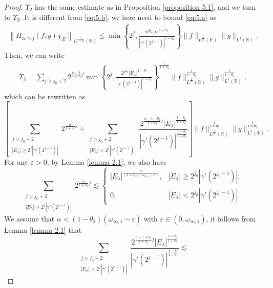 \documentclass[11pt, twoside, leqno]{article}
\theoremstyle{definition}
\numberwithin{equation}{section}
\begin{document}
\begin{proof}
$\Upsilon_2$ has the same estimate as in Proposition \ref{proposition 5.1}, and we turn to $\Upsilon_3$. It is different from \eqref{eq:5.b}, we here need to bound \eqref{eq:5.a} as
\begin{align}\label{eq:5.000}
  \left\|H_{\alpha,\gamma,j}(f,g)\chi_{E}\right\|_{L^{\frac{1}{1+\theta_2}}(\mathbb{R})}
\leq \min\left\{2^j,  \frac{2^{j\theta_2}|E|^{1-\theta_2}}{|\gamma'(2^{j-1})|^{1-\theta_2}} \right\} \|f\|_{L^{\frac{1}{\theta_2}}(\mathbb{R})}\|g\|_{L^{1}(\mathbb{R})}.
 \end{align}
Then, we can write
\begin{align*}
\Upsilon_{3}=\sum\limits_{j>j_{0}+2}2^{{\frac{\alpha-1}{1+\theta_{2}}}j}\min\left\{2^j,  \frac{2^{j\theta_2}|E_{\lambda}|^{1-\theta_2}}{|\gamma'(2^{j-1})|^{1-\theta_2}} \right\}^{\frac{1}{1+\theta_2}} \|f\|^{\frac{1}{1+\theta_2}}_{L^{\frac{1}{\theta_2}}(\mathbb{R})}\|g\|^{\frac{1}{1+\theta_2}}_{L^{1}(\mathbb{R})},
 \end{align*}
which can be rewritten as
$$\left[\sum\limits_{  \substack{j>j_{0}+2   \\ |E_{\lambda}|\geq2^j{|\gamma'(2^{j-1})|} }} 2^{{\frac{\alpha}{1+\theta_{2}}}j}+
\sum\limits_{  \substack{j>j_{0}+2   \\ |E_{\lambda}|<2^j{|\gamma'(2^{j-1})|} }} \frac{2^{{\frac{\alpha-1+\theta_{2}}{1+\theta_{2}}}j}
|E_\lambda|^{\frac{1-\theta_{2}}{1+\theta_{2}}}}{|\gamma'(2^{j-1})|^{\frac{1-\theta_{2}}{1+\theta_{2}}}}\right]
\|f\|^{\frac{1}{1+\theta_2}}_{L^{\frac{1}{\theta_2}}(\mathbb{R})}\|g\|^{\frac{1}{1+\theta_2}}_{L^{1}(\mathbb{R})}.$$
For any $\varepsilon>0$, by Lemma \ref{lemma 2.1}, we also have
$$\sum\limits_{  \substack{j>j_{0}+2   \\ |E_{\lambda}|\geq2^j{|\gamma'(2^{j-1})|} }} 2^{{\frac{\alpha}{1+\theta_{2}}}j}\lesssim
\begin{cases}
  |E_\lambda|^{\frac{\alpha}{(1+\theta_{2})(\omega_{\infty,1}-\varepsilon)}}, & |E_\lambda|\geq2^{j_0}|\gamma'(2^{j_{0}-1})|;\\
  0, & |E_\lambda|<2^{j_0}|\gamma'(2^{j_{0}-1})|.
\end{cases}$$
We assume that $\alpha<(1-\theta_2)(\omega_{\infty,1}-\varepsilon)$ with $\varepsilon\in(0, \omega_{\infty,1})$, it follows from Lemma \ref{lemma 2.1} that
$$\sum\limits_{  \substack{j>j_{0}+2   \\ |E_{\lambda}|<2^j{|\gamma'(2^{j-1})|} }} \frac{2^{{\frac{\alpha-1+\theta_{2}}{1+\theta_{2}}}j}
|E_\lambda|^{\frac{1-\theta_{2}}{1+\theta_{2}}}}{|\gamma'(2^{j-1})|^{\frac{1-\theta_{2}}{1+\theta_{2}}}}\lesssim
$$
\end{proof}
\end{document}
